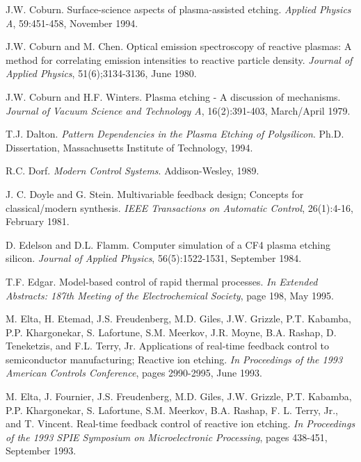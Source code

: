 \begin{thebibliography}{100}
	 J.W. Coburn. Surface-science aspects of plasma-assisted etching. \emph{Applied Physics A}, 59:451-458, November 1994.

	
	 J.W. Coburn and M. Chen. Optical emission spectroscopy of reactive plasmas: A method for correlating emission intensities to reactive particle density. \emph{Journal of Applied Physics}, 51(6);3134-3136, June 1980.
	
	 J.W. Coburn and H.F. Winters. Plasma etching - A discussion of mechanisms. \emph{Journal of Vacuum Science and Technology A}, 16(2):391-403, March/April 1979.
	
	 T.J. Dalton. \emph{Pattern Dependencies in the Plasma Etching of Polysilicon}. Ph.D. Dissertation, Massachusetts Institute of Technology, 1994.
	
	 R.C. Dorf. \emph{Modern Control Systems}. Addison-Wesley, 1989.
	
	 J. C. Doyle and G. Stein. Multivariable feedback design; Concepts for classical/modern synthesis. \emph{IEEE Transactions on Automatic Control}, 26(1):4-16, February 1981.
	
	 D. Edelson and D.L. Flamm. Computer simulation of a CF4 plasma etching silicon. \emph{Journal of Applied Physics}, 56(5):1522-1531, September 1984.
	
	 T.F. Edgar. Model-based control of rapid thermal processes. \emph{In Extended Abstracts: 187th Meeting of the Electrochemical Society}, page 198, May 1995.
	
	 M. Elta, H. Etemad, J.S. Freudenberg, M.D. Giles, J.W. Grizzle, P.T. Kabamba, P.P. Khargonekar, S. Lafortune, S.M. Meerkov, J.R. Moyne, B.A. Rashap, D. Teneketzis, and F.L. Terry, Jr. Applications of real-time feedback control to semiconductor manufacturing; Reactive ion etching. \emph{In Proceedings of the 1993 American Controls Conference}, pages 2990-2995, June 1993.
	
	 M. Elta, J. Fournier, J.S. Freudenberg, M.D. Giles, J.W. Grizzle, P.T. Kabamba, P.P. Khargonekar, S. Lafortune, S.M. Meerkov, B.A. Rashap, F. L. Terry, Jr., and T. Vincent. Real-time feedback control of reactive ion etching. \emph{In Proceedings of the 1993 SPIE Symposium on Microelectronic Processing}, pages 438-451, September 1993.
	

\end{thebibliography}
